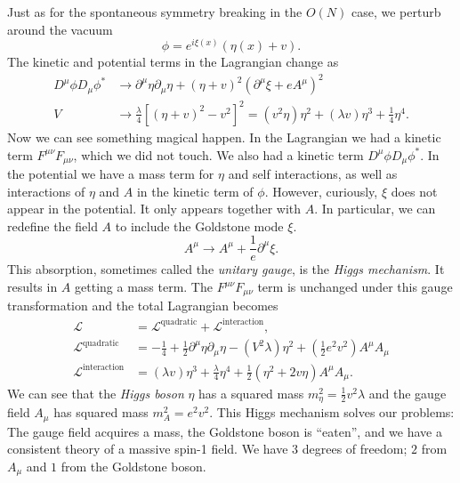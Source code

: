 Just as for the spontaneous symmetry breaking in the $O(N)$ case, we perturb around the vacuum
\begin{equation}
  \phi = e^{i \xi(x)} (\eta(x) + v).
\end{equation}
The kinetic and potential terms in the Lagrangian change as 
\begin{align}
  D^{\mu} \phi D_{\mu} \phi^* &\to \partial^{\mu} \eta \partial_{\mu} \eta + (\eta + v)^2 (\partial^{\mu} \xi + e A^{\mu})^2 \\
  V &\to \frac{\lambda}{4} [(\eta + v)^2 - v^2]^2 = (v^2 \eta) \eta^2 + (\lambda v)\eta^3 + \frac{1}{4} \eta^4.
\end{align}
Now we can see something magical happen. In the Lagrangian we had a kinetic term $F^{\mu\nu} F_{\mu\nu}$, which we did not touch. We also had a kinetic term $D^{\mu} \phi D_{\mu} \phi^*$. 
In the potential we have a mass term for $\eta$ and self interactions, as well as interactions of $\eta$ and $A$ in the kinetic term of $\phi$.
However, curiously, $\xi$ does not appear in the potential. It only appears together with $A$. In particular, we can redefine the field $A$ to include the Goldstone mode $\xi$. 
\begin{equation}
  A^{\mu} \to A^{\mu} + \frac{1}{e} \partial^{\mu} \xi.
\end{equation}
This absorption, sometimes called the \emph{unitary gauge}, is the \emph{Higgs mechanism}.
It results in $A$ getting a mass term.
The $F^{\mu\nu} F_{\mu\nu}$ term is unchanged under this gauge transformation and the total Lagrangian becomes
\begin{align}
  \mathscr{L} &= \mathscr{L}^{\text{quadratic}} + \mathscr{L}^{\text{interaction}}, \\
  \mathscr{L}^{\text{quadratic}} &= -\frac{1}{4} + \frac{1}{2} \partial^{\mu} \eta \partial_{\mu} \eta - (V^2 \lambda) \eta^2 + (\frac{1}{2} e^2 v^2) A^{\mu} A_{\mu} \\
  \mathscr{L}^{\text{interaction}} &= (\lambda v)\eta^3 + \frac{\lambda}{4} \eta^4 + \frac{1}{2} (\eta^2 + 2 v \eta) A^{\mu} A_{\mu}.
\end{align}
We can see that the \emph{Higgs boson} $\eta$ has a squared mass $m_{\eta}^2 = \frac{1}{2} v^2 \lambda$ and the gauge field $A_{\mu}$ has squared mass $m_A^2 = e^2 v^2$.
This Higgs mechanism solves our problems:
The gauge field acquires a mass, the Goldstone boson is ``eaten'', and we have a consistent theory of a massive spin-1 field.
We have 3 degrees of freedom; $2$ from $A_{\mu}$ and $1$ from the Goldstone boson.
